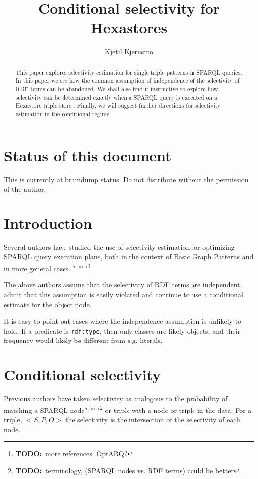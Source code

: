 \documentclass[12pt, draft]{article}
\title{Conditional selectivity for Hexastores}
\author{Kjetil Kjernsmo}
\newcommand{\rdfnode}[1]{\texttt{#1}}
\newcommand{\todo}[1]{\ensuremath{^{\textrm{\tiny{TODO}\normalsize}}}\footnote{\textbf{TODO:}~#1}}
\begin{document}
\maketitle

\section*{Status of this document}

This is currently at braindump status. Do not distribute without the
permission of the author.

\begin{abstract}
  This paper explores selectivity estimation for single triple
  patterns in SPARQL queries. In this paper we see how the common
  assumption of independence of the selectivity of RDF terms can be
  abandoned. We shall also find it instructive to explore how
  selectivity can be determined exactly when a SPARQL query is
  executed on a Hexastore triple store
  \cite{Weiss:2008:HSI:1453856.1453965}. Finally, we will suggest
  further directions for selectivity estimation in the conditional
  regime.

\end{abstract}

\section{Introduction}

Several authors have studied the use of selectivity estimation for
optimizing SPARQL query execution plans, both in the context of Basic
Graph Patterns \cite{Stocker:2008:SBG:1367497.1367578} and in more
general cases. \todo{more references. OptARQ?}

The above authors assume that the selectivity of RDF terms are
independent, admit that this assumption is easily violated and
continue to use a conditional estimate for the object node.

It is easy to point out cases where the independence assumption is
unlikely to hold: If a predicate is \rdfnode{rdf:type}, then only
classes are likely objects, and their frequency  would likely be
different from e.g. literals.

\section{Conditional selectivity}

Previous authors have taken selectivity as analogous to the
probability of matching a SPARQL node\todo{terminology, (SPARQL nodes
  vs. RDF terms) could be better} or triple with a node or triple
in the data. For a triple, $<S, P, O>$ the selectivity is the
intersection of the selectivity of each node.
\end{document}
